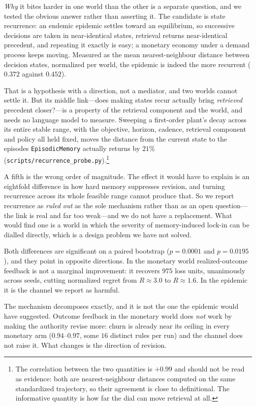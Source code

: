 \documentclass[11pt]{article}
\begin{document}
\emph{Why} it bites harder in one world than the other is a separate question, and we tested the
obvious answer rather than asserting it. The candidate is state recurrence: an endemic epidemic
settles toward an equilibrium, so successive decisions are taken in near-identical states, retrieval
returns near-identical precedent, and repeating it exactly is easy; a monetary economy under a demand
process keeps moving. Measured as the mean nearest-neighbour distance between decision states,
normalized per world, the epidemic is indeed the more recurrent ($0.372$ against $0.452$).

That is a hypothesis with a direction, not a mediator, and two worlds cannot settle it. But its
middle link---does making states recur actually bring \emph{retrieved} precedent closer?---is a
property of the retrieval component and the world, and needs no language model to measure. Sweeping a
first-order plant's decay across its entire stable range, with the objective, horizon, cadence,
retrieval component and policy all held fixed, moves the distance from the current state to the
episodes \texttt{EpisodicMemory} actually returns by $21\%$
(\texttt{scripts/recurrence\_probe.py}).\footnote{The correlation between the two quantities is
$+0.99$ and should not be read as evidence: both are nearest-neighbour distances computed on the same
standardized trajectory, so their agreement is close to definitional. The informative quantity is how
far the dial can move retrieval at all.}

A fifth is the wrong order of magnitude. The effect it would have to explain is an eightfold
difference in how hard memory suppresses revision, and turning recurrence across its whole feasible
range cannot produce that. So we report recurrence as \emph{ruled out} as the sole mechanism rather
than as an open question---the link is real and far too weak---and we do not have a replacement. What
would find one is a world in which the severity of memory-induced lock-in can be dialled directly,
which is a design problem we have not solved.

Both differences are significant on a paired bootstrap ($p=0.0001$ and $p=0.0195$), and they point in
opposite directions. In the monetary world realized-outcome feedback is not a marginal improvement:
it recovers $975$ loss units, unanimously across seeds, cutting normalized regret from $R\approx3.0$
to $R\approx1.6$. In the epidemic it is the channel we report as harmful.

The mechanism decomposes exactly, and it is not the one the epidemic would have suggested. Outcome
feedback in the monetary world does \emph{not} work by making the authority revise more: churn is
already near its ceiling in every monetary arm ($0.94$--$0.97$, some $16$ distinct rules per run) and
the channel does not raise it. What changes is the direction of revision.
\end{document}
